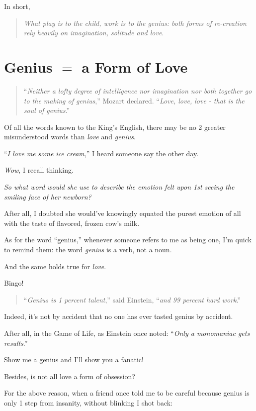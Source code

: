 \documentclass{book}
\numberwithin{equation}{section}
\begin{document}
%
In short,

\begin{quotation}
    \textit{What play is to the child, work is to the genius: both forms of re-creation rely heavily on imagination, solitude and love}.
\end{quotation}

\section{Genius $=$ a Form of Love}

\begin{quotation}
    ``\textit{Neither a lofty degree of intelligence nor imagination nor both together go to the making of genius},'' Mozart declared. ``\textit{Love, love, love - that is the soul of genius}.''
\end{quotation}
Of all the words known to the King's English, there may be no 2 greater misunderstood words than \textit{love} and \textit{genius}.

%
``\textit{I love me some ice cream},'' I heard someone say the other day.

%
\textit{Wow}, I recall thinking.

\textit{So what word would she use to describe the emotion felt upon 1st seeing the smiling face of her newborn?}

After all, I doubted she would've knowingly equated the purest emotion of all with the taste of flavored, frozen cow's milk.

%
As for the word ``genius,'' whenever someone refers to me as being one, I'm quick to remind them: the word \textit{genius} is a verb, not a noun.

And the same holds true for \textit{love}.

%
Bingo!

\begin{quotation}
    ``\textit{Genius is 1 percent talent},'' said Einstein, ``\textit{and 99 percent hard work}.''
\end{quotation}
Indeed, it's not by accident that no one has ever tasted genius by accident.

After all, in the Game of Life, as Einstein once noted: ``\textit{Only a monomaniac gets results}.''

%
Show me a genius and I'll show you a fanatic!

Besides, is not all love a form of obsession?

%
For the above reason, when a friend once told me to be careful because genius is only 1 step from insanity, without blinking I shot back:
\end{document}
